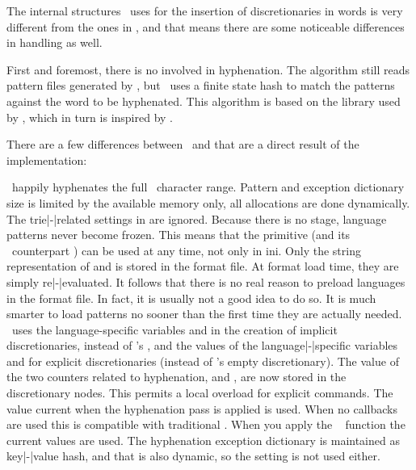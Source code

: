 
\stopsection

\startsection[title={Applying hyphenation}]

The internal structures \LUATEX\ uses for the insertion of discretionaries in
words is very different from the ones in , and that means there are some
noticeable differences in handling as well.

First and foremost, there is no  involved in hyphenation.
The algorithm still reads pattern files generated by \PATGEN, but \LUATEX\ uses a
finite state hash to match the patterns against the word to be hyphenated. This
algorithm is based on the  library used by \OPENOFFICE, which in
turn is inspired by \TEX.

There are a few differences between \LUATEX\ and  that are a direct result
of the implementation:

\startitemize
\startitem
    \LUATEX\ happily hyphenates the full \UNICODE\ character range.
\stopitem
\startitem
    Pattern and exception dictionary size is limited by the available memory
    only, all allocations are done dynamically. The trie|-|related settings in
     are ignored.
\stopitem
\startitem
    Because there is no  stage, language patterns never
    become frozen. This means that the primitive \type {\patterns} (and its \LUA\
    counterpart ) can be used at any time, not only in
    ini\TEX.
\stopitem
\startitem
    Only the string representation of \type {\patterns} and \type {\hyphenation} is
    stored in the format file. At format load time, they are simply
    re|-|evaluated. It follows that there is no real reason to preload languages
    in the format file. In fact, it is usually not a good idea to do so. It is
    much smarter to load patterns no sooner than the first time they are actually
    needed.
\stopitem
\startitem
    \LUATEX\ uses the language-specific variables \type {\prehyphenchar} and \type
    {\posthyphenchar} in the creation of implicit discretionaries, instead of
    \TEX82's \type {\hyphenchar}, and the values of the language|-|specific
    variables \type {\preexhyphenchar} and \type {\postexhyphenchar} for explicit
    discretionaries (instead of \TEX82's empty discretionary).
\stopitem
\startitem
    The value of the two counters related to hyphenation, \type {\hyphenpenalty}
    and \type {\exhyphenpenalty}, are now stored in the discretionary nodes. This
    permits a local overload for explicit \type {\discretionary} commands. The
    value current when the hyphenation pass is applied is used. When no callbacks
    are used this is compatible with traditional \TEX. When you apply the \LUA\
     function the current values are used.
\stopitem
\startitem
    The hyphenation exception dictionary is maintained as key|-|value hash, and
    that is also dynamic, so the  setting is not used either.
\stopitem
\stopitemize

